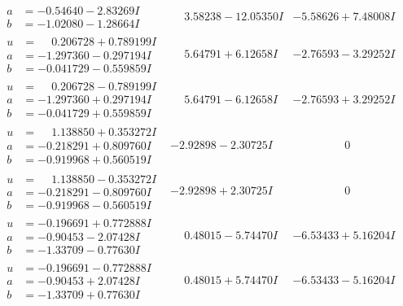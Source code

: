 \documentclass[1p]{elsarticle_modified}
\theoremstyle{definition}
\begin{document}
$$\begin{array}{c|c|c}
\begin{aligned}
a &= -0.54640 - 2.83269 I \\
b &= -1.02080 - 1.28664 I\end{aligned}
 & \phantom{-}3.58238 - 12.05350 I & -5.58626 + 7.48008 I \\ \hline\begin{aligned}
u &= \phantom{-}0.206728 + 0.789199 I \\
a &= -1.297360 - 0.297194 I \\
b &= -0.041729 - 0.559859 I\end{aligned}
 & \phantom{-}5.64791 + 6.12658 I & -2.76593 - 3.29252 I \\ \hline\begin{aligned}
u &= \phantom{-}0.206728 - 0.789199 I \\
a &= -1.297360 + 0.297194 I \\
b &= -0.041729 + 0.559859 I\end{aligned}
 & \phantom{-}5.64791 - 6.12658 I & -2.76593 + 3.29252 I \\ \hline\begin{aligned}
u &= \phantom{-}1.138850 + 0.353272 I \\
a &= -0.218291 + 0.809760 I \\
b &= -0.919968 + 0.560519 I\end{aligned}
 & -2.92898 - 2.30725 I & \phantom{-0.000000 } 0 \\ \hline\begin{aligned}
u &= \phantom{-}1.138850 - 0.353272 I \\
a &= -0.218291 - 0.809760 I \\
b &= -0.919968 - 0.560519 I\end{aligned}
 & -2.92898 + 2.30725 I & \phantom{-0.000000 } 0 \\ \hline\begin{aligned}
u &= -0.196691 + 0.772888 I \\
a &= -0.90453 - 2.07428 I \\
b &= -1.33709 - 0.77630 I\end{aligned}
 & \phantom{-}0.48015 - 5.74470 I & -6.53433 + 5.16204 I \\ \hline\begin{aligned}
u &= -0.196691 - 0.772888 I \\
a &= -0.90453 + 2.07428 I \\
b &= -1.33709 + 0.77630 I\end{aligned}
 & \phantom{-}0.48015 + 5.74470 I & -6.53433 - 5.16204 I \\ \hline\begin{aligned}

\end{aligned}
\end{array}$$
\end{document}
